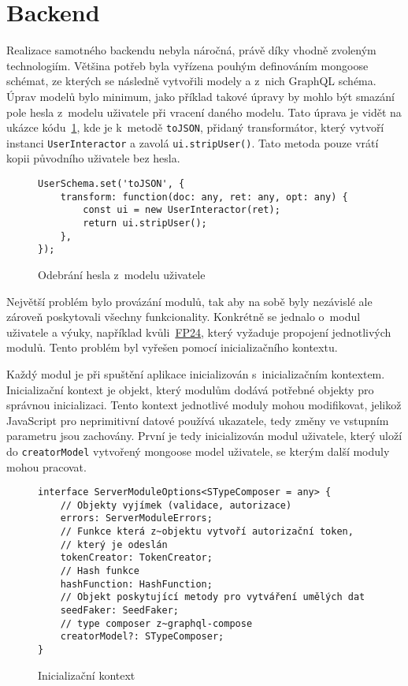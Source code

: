 \section{Backend}
\label{sc:backend}
Realizace samotného backendu nebyla náročná, právě díky vhodně zvoleným technologiím. Většina potřeb byla vyřízena pouhým definováním mongoose schémat, ze kterých se následně vytvořili modely a z~nich GraphQL schéma. Úprav modelů bylo minimum, jako příklad takové úpravy by mohlo být smazání pole hesla z~modelu uživatele při vracení daného modelu. Tato úprava je vidět na ukázce kódu~\ref{code:to_json_user}, kde je k~metodě \texttt{toJSON}, přidaný transformátor, který vytvoří instanci \texttt{UserInteractor} a zavolá \texttt{ui.stripUser()}. Tato metoda pouze vrátí kopii původního uživatele bez hesla.

\begin{figure}[h]
    \centering
    \begin{verbatim}
UserSchema.set('toJSON', {
    transform: function(doc: any, ret: any, opt: any) {
        const ui = new UserInteractor(ret);
        return ui.stripUser();
    },
});
    \end{verbatim}
    \caption{Odebrání hesla z~modelu uživatele}
    \label{code:to_json_user}
\end{figure}

\pagebreak

Největší problém bylo provázání modulů, tak aby na sobě byly nezávislé ale zároveň poskytovali všechny funkcionality. Konkrétně se jednalo o~modul uživatele a výuky, například kvůli~\hyperref[FP24]{FP24}, který vyžaduje propojení jednotlivých modulů. Tento problém byl vyřešen pomocí inicializačního kontextu.

Každý modul je při spuštění aplikace inicializován s~inicializačním kontextem. Inicializační kontext je objekt, který modulům dodává potřebné objekty pro správnou inicializaci. Tento kontext jednotlivé moduly mohou modifikovat, jelikož JavaScript pro neprimitivní datové používá ukazatele, tedy změny ve vstupním parametru jsou zachovány. První je tedy inicializován modul uživatele, který uloží do \texttt{creatorModel} vytvořený mongoose model uživatele, se kterým další moduly mohou pracovat.

\begin{figure}[h]
    \centering
    \begin{verbatim}
interface ServerModuleOptions<STypeComposer = any> {
    // Objekty vyjímek (validace, autorizace)
    errors: ServerModuleErrors;
    // Funkce která z~objektu vytvoří autorizační token,
    // který je odeslán
    tokenCreator: TokenCreator;
    // Hash funkce
    hashFunction: HashFunction; 
    // Objekt poskytující metody pro vytváření umělých dat
    seedFaker: SeedFaker;
    // type composer z~graphql-compose
    creatorModel?: STypeComposer; 
}
    \end{verbatim}
    \caption{Inicializační kontext}
    \label{code:server_module_options}
\end{figure}

